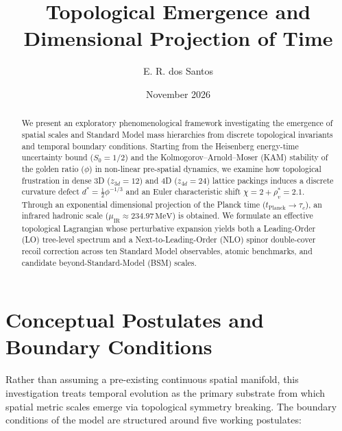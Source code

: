 \documentclass[11pt,a4paper]{article}
\title{\textbf{Topological Emergence and Dimensional Projection of Time}}
\author{E. R. dos Santos}
\date{November 2026}
\begin{document}
\maketitle

\begin{abstract}
We present an exploratory phenomenological framework investigating the emergence of spatial scales and Standard Model mass hierarchies from discrete topological invariants and temporal boundary conditions. Starting from the Heisenberg energy-time uncertainty bound ($S_0 = 1/2$) and the Kolmogorov--Arnold--Moser (KAM) stability of the golden ratio ($\phi$) in non-linear pre-spatial dynamics, we examine how topological frustration in dense 3D ($z_{3d} = 12$) and 4D ($z_{4d} = 24$) lattice packings induces a discrete curvature defect $d^* = \frac{1}{2}\phi^{-1/3}$ and an Euler characteristic shift $\chi = 2 + \rho_v^* = 2.1$. Through an exponential dimensional projection of the Planck time ($t_{\mathrm{Planck}} \to \tau_c$), an infrared hadronic scale ($\mu_{\mathrm{IR}} \approx 234.97\,\mathrm{MeV}$) is obtained. We formulate an effective topological Lagrangian whose perturbative expansion yields both a Leading-Order (LO) tree-level spectrum and a Next-to-Leading-Order (NLO) spinor double-cover recoil correction across ten Standard Model observables, atomic benchmarks, and candidate beyond-Standard-Model (BSM) scales.
\end{abstract}

\section{Conceptual Postulates and Boundary Conditions}

Rather than assuming a pre-existing continuous spatial manifold, this investigation treats temporal evolution as the primary substrate from which spatial metric scales emerge via topological symmetry breaking. The boundary conditions of the model are structured around five working postulates:
\end{document}
